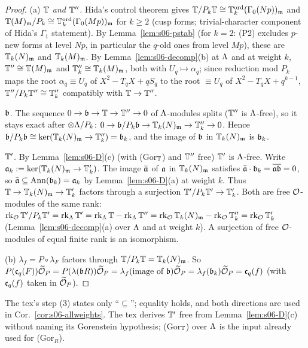 \begin{proof}
(a) \emph{$\mathbb{T}$ and $\mathbb{T}''$.} Hida's control theorem \cite[Cor.~3.2, (3.3b), p.~250]{Hi86b}
 \stcited{} gives
$\mathbb{T}/P_k\mathbb{T}\cong\mathbb{T}^{\mathrm{ord}}_k(\Gamma_0(Np))_{\mathfrak{m}}$ and $\mathbb{T}(M)_{\mathfrak{m}}/P_k\cong\mathbb{T}^{\mathrm{ord}}_k(\Gamma_0(Mp))_{\mathfrak{m}}$ for $k\ge2$ (cusp forms; trivial-character
component of Hida's $\Gamma_1$ statement). By Lemma~\ref{lem:s06-pstab} (for $k=2$: (P2) excludes $p$-new forms at level $Np$, in
particular the $q$-old ones from level $Mp$), these are $\mathbb{T}_k(N)_{\mathfrak{m}}$ and $\mathbb{T}_k(M)_{\mathfrak{m}}$. By Lemma~\ref{lem:s06-decomp}(b) at $\Lambda$ and at
weight $k$, $\mathbb{T}''\cong\mathbb{T}(M)_{\mathfrak{m}}$ and $\mathbb{T}''_k\cong\mathbb{T}_k(M)_{\mathfrak{m}}$, both with $U_q\mapsto\alpha_q$; since reduction mod $P_k$ maps the root
$\alpha_q\equiv U_q$ of $X^2-T_qX+qS_q$ to the root $\equiv U_q$ of $X^2-T_qX+q^{k-1}$, $\mathbb{T}''/P_k\mathbb{T}''\cong\mathbb{T}''_k$ compatibly with
$\mathbb{T}\to\mathbb{T}''$.

\emph{$\mathfrak{b}$.} The sequence $0\to\mathfrak{b}\to\mathbb{T}\to\mathbb{T}''\to0$ of $\Lambda$-modules splits ($\mathbb{T}''$ is $\Lambda$-free), so it stays exact after
$\otimes\Lambda/P_k$: $0\to\mathfrak{b}/P_k\mathfrak{b}\to\mathbb{T}_k(N)_{\mathfrak{m}}\to\mathbb{T}''_k\to0$. Hence $\mathfrak{b}/P_k\mathfrak{b}\cong\ker(\mathbb{T}_k(N)_{\mathfrak{m}}\to\mathbb{T}''_k)=\mathfrak{b}_k$, and the image of $\mathfrak{b}$
in $\mathbb{T}_k(N)_{\mathfrak{m}}$ is $\mathfrak{b}_k$.

\emph{$\mathbb{T}'$.} By Lemma~\ref{lem:s06-D}(c) (with (Gor$_{\mathbb{T}}$) and $\mathbb{T}''$ free) $\mathbb{T}'$ is $\Lambda$-free. Write $\mathfrak{a}_k:=\ker(\mathbb{T}_k(N)_{\mathfrak{m}}\to\mathbb{T}'_k)$. The
image $\bar{\mathfrak{a}}$ of $\mathfrak{a}$ in $\mathbb{T}_k(N)_{\mathfrak{m}}$ satisfies $\bar{\mathfrak{a}}\cdot\mathfrak{b}_k=\overline{\mathfrak{a}\mathfrak{b}}=0$, so $\bar{\mathfrak{a}}\subseteq\operatorname{Ann}(\mathfrak{b}_k)=\mathfrak{a}_k$ by
Lemma~\ref{lem:s06-D}(a) at weight $k$. Thus $\mathbb{T}\to\mathbb{T}_k(N)_{\mathfrak{m}}\to\mathbb{T}'_k$ factors through a surjection $\mathbb{T}'/P_k\mathbb{T}'\to\mathbb{T}'_k$. Both are free
$\mathcal{O}$-modules of the same rank: $\operatorname{rk}_{\mathcal{O}}\mathbb{T}'/P_k\mathbb{T}'=\operatorname{rk}_\Lambda\mathbb{T}'=\operatorname{rk}_\Lambda\mathbb{T}-\operatorname{rk}_\Lambda\mathbb{T}''=\operatorname{rk}_{\mathcal{O}}\mathbb{T}_k(N)_{\mathfrak{m}}-\operatorname{rk}_{\mathcal{O}}\mathbb{T}''_k=\operatorname{rk}_{\mathcal{O}}\mathbb{T}'_k$
(Lemma~\ref{lem:s06-decomp}(a) over $\Lambda$ and at weight $k$). A surjection of free $\mathcal{O}$-modules of equal finite rank is an
isomorphism.

(b) $\lambda_f=P\circ\lambda_F$ factors through $\mathbb{T}/P_k\mathbb{T}=\mathbb{T}_k(N)_{\mathfrak{m}}$. So $P(\mathfrak{c}_q(F))\widetilde{\mathcal{O}}_P=P(\lambda(\mathfrak{b} R))\widetilde{\mathcal{O}}_P=\lambda_f(\text{image of
}\mathfrak{b})\widetilde{\mathcal{O}}_P=\lambda_f(\mathfrak{b}_k)\widetilde{\mathcal{O}}_P=\mathfrak{c}_q(f)$ (with $\mathfrak{c}_q(f)$ taken in $\widetilde{\mathcal{O}}_P$).
\end{proof}
\noindent The tex's step (3) states only ``$\subseteq$''; equality holds, and both directions are used in Cor.~\ref{cor:s06-allweights}.
The tex derives $\mathbb{T}'$ free from Lemma~\ref{lem:s06-D}(c) without naming its Gorenstein hypothesis; (Gor$_{\mathbb{T}}$) over $\Lambda$ is the
input \cite[\S3.3]{Hs} already used for (Gor$_R$).

